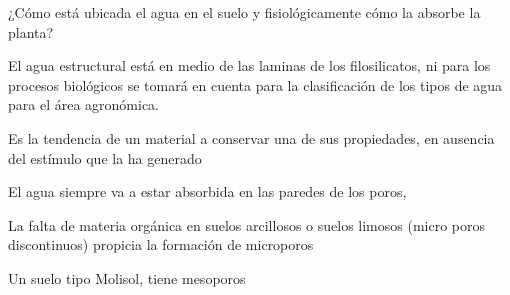 ¿Cómo está ubicada el agua en el suelo y fisiológicamente cómo la absorbe la planta?

El agua estructural está en medio de las laminas de los filosilicatos, ni para los procesos biológicos se tomará en cuenta para la clasificación de los tipos de agua para el área agronómica.
\begin{definition}[Histeresis]
    Es la tendencia de un material a conservar una de sus propiedades, en ausencia del estímulo que la ha generado
\end{definition}
El agua siempre va a estar absorbida en las paredes de los poros, 

La falta de materia orgánica en suelos arcillosos o suelos limosos (micro poros discontinuos) propicia la formación de microporos

Un suelo tipo Molisol, tiene mesoporos
